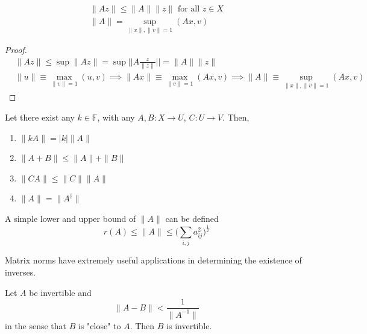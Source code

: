   \begin{theorem}
    \begin{align}
      \|A z\| \leq \|A\| \|z\| \text{ for all } z \in X \\
      \|A\| = \sup_{\|x\|, \|v\| = 1} (A x, v)
    \end{align}
  \end{theorem}
  \begin{proof}
    \begin{align*}
      &\|A z\| \leq \sup{\|A z\|} = \sup{\Big|\Big| A \frac{z}{\|z\|} \Big|\Big|} = \|A\| \|z\| \\
      &\|u\| \equiv \max_{\|v\|=1} (u, v) \implies \|A x\| \equiv \max_{\|v\|=1} (Ax, v) \implies \|A\| \equiv \sup_{\|x\|, \|v\| =1} (A x, v)
    \end{align*}
  \end{proof}

  \begin{theorem}
    Let there exist any $k \in \mathbb{F}$, with any $A, B: X \longrightarrow U$, $C: U \longrightarrow V$. Then, 
    \begin{enumerate}
      \item $\|k A\| = |k| \|A\|$
      \item $\|A + B\| \leq \|A\| + \|B\|$
      \item $\|C A\| \leq \|C\| \|A\|$
      \item $\|A\| = \|A^\dagger\|$
    \end{enumerate}
  \end{theorem}

  \begin{theorem}
    A simple lower and upper bound of $\|A\|$ can be defined
    \begin{equation}
      r(A) \leq \|A\| \leq \bigg( \sum_{i, j} a_{i j}^2 \bigg)^\frac{1}{2}
    \end{equation}
  \end{theorem}

  Matrix norms have extremely useful applications in determining the existence of inverses. 

  \begin{theorem}
    Let $A$ be invertible and 
    \begin{equation}
      \|A - B\| < \frac{1}{\|A^{-1}\|}
    \end{equation}
    in the sense that $B$ is "close" to $A$. Then $B$ is invertible. 
  \end{theorem}


